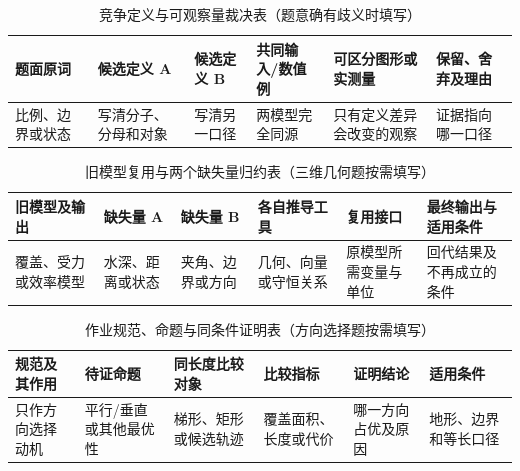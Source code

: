 \documentclass[withoutpreface,bwprint]{cumcmthesis}
\begin{document}
  \begin{table}[H]
    \centering
    \small
    \setlength{\tabcolsep}{3.5pt}
    \caption{竞争定义与可观察量裁决表（题意确有歧义时填写）}
    \label{tab:competing-definition-guide}
    \begin{tabular}{p{1.9cm}p{2.25cm}p{2.25cm}p{2.0cm}p{2.7cm}p{2.3cm}}
      \toprule
      题面原词 & 候选定义 A & 候选定义 B & 共同输入/数值例 & 可区分图形或实测量 & 保留、舍弃及理由 \\
      \midrule
      比例、边界或状态 & 写清分子、分母和对象 & 写清另一口径 & 两模型完全同源 & 只有定义差异会改变的观察 & 证据指向哪一口径 \\
      \bottomrule
    \end{tabular}
  \end{table}
  \begin{table}[H]
    \centering
    \small
    \setlength{\tabcolsep}{3.5pt}
    \caption{旧模型复用与两个缺失量归约表（三维几何题按需填写）}
    \label{tab:two-missing-quantities-guide}
    \begin{tabular}{p{2.1cm}p{2.0cm}p{2.0cm}p{2.25cm}p{2.15cm}p{2.3cm}}
      \toprule
      旧模型及输出 & 缺失量 A & 缺失量 B & 各自推导工具 & 复用接口 & 最终输出与适用条件 \\
      \midrule
      覆盖、受力或效率模型 & 水深、距离或状态 & 夹角、边界或方向 & 几何、向量或守恒关系 & 原模型所需变量与单位 & 回代结果及不再成立的条件 \\
      \bottomrule
    \end{tabular}
  \end{table}
  \begin{table}[H]
    \centering
    \small
    \setlength{\tabcolsep}{3.5pt}
    \caption{作业规范、命题与同条件证明表（方向选择题按需填写）}
    \label{tab:norm-proof-guide}
    \begin{tabular}{p{2.15cm}p{2.35cm}p{2.25cm}p{2.25cm}p{2.25cm}p{2.0cm}}
      \toprule
      规范及其作用 & 待证命题 & 同长度比较对象 & 比较指标 & 证明结论 & 适用条件 \\
      \midrule
      只作方向选择动机 & 平行/垂直或其他最优性 & 梯形、矩形或候选轨迹 & 覆盖面积、长度或代价 & 哪一方向占优及原因 & 地形、边界和等长口径 \\
      \bottomrule
    \end{tabular}
  \end{table}
\fi
\end{document}
